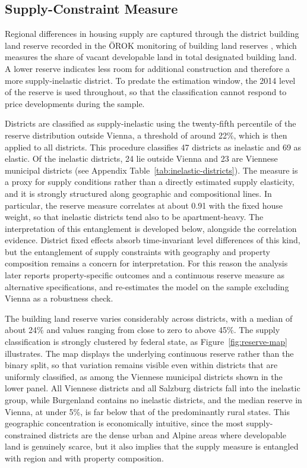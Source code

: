 \documentclass[a4paper,12pt, headsepline]{scrartcl}
\numberwithin{equation}{section}
\begin{document}
\subsection{Supply-Constraint Measure}\label{subsec:supply-measure}
Regional differences in housing supply are captured through the district building land reserve recorded in the ÖROK monitoring of building land reserves \citep{oerok_blr}, which measures the share of vacant developable land in total designated building land. A lower reserve indicates less room for additional construction and therefore a more supply-inelastic district. To predate the estimation window, the 2014 level of the reserve is used throughout, so that the classification cannot respond to price developments during the sample.

Districts are classified as supply-inelastic using the twenty-fifth percentile of the reserve distribution outside Vienna, a threshold of around 22\%, which is then applied to all districts. This procedure classifies 47 districts as inelastic and 69 as elastic. Of the inelastic districts, 24 lie outside Vienna and 23 are Viennese municipal districts (see Appendix Table~\ref{tab:inelastic-districts}). The measure is a proxy for supply conditions rather than a directly estimated supply elasticity, and it is strongly structured along geographic and compositional lines. In particular, the reserve measure correlates at about 0.91 with the fixed house weight, so that inelastic districts tend also to be apartment-heavy. The interpretation of this entanglement is developed below, alongside the correlation evidence. District fixed effects absorb time-invariant level differences of this kind, but the entanglement of supply constraints with geography and property composition remains a concern for interpretation. For this reason the analysis later reports property-specific outcomes and a continuous reserve measure as alternative specifications, and re-estimates the model on the sample excluding Vienna as a robustness check.

The building land reserve varies considerably across districts, with a median of about 24\% and values ranging from close to zero to above 45\%. The supply classification is strongly clustered by federal state, as Figure~\ref{fig:reserve-map} illustrates. The map displays the underlying continuous reserve rather than the binary split, so that variation remains visible even within districts that are uniformly classified, as among the Viennese municipal districts shown in the lower panel. All Viennese districts and all Salzburg districts fall into the inelastic group, while Burgenland contains no inelastic districts, and the median reserve in Vienna, at under 5\%, is far below that of the predominantly rural states. This geographic concentration is economically intuitive, since the most supply-constrained districts are the dense urban and Alpine areas where developable land is genuinely scarce, but it also implies that the supply measure is entangled with region and with property composition.
\end{document}

